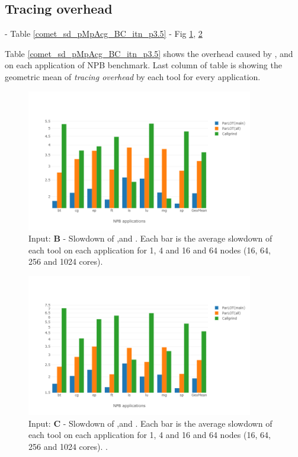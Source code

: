 

\subsection{Tracing overhead}
\label{subsec:lowtoh}
 - Table \ref{comet_sd_pMpAcg_BC_itn_p3.5}
 - Fig \ref{comet_chartAvg_sd_B_p3_5}, \ref{comet_chartAvg_sd_C_p3_5} 
 

   
Table \ref{comet_sd_pMpAcg_BC_itn_p3.5} shows the overhead caused by \parlotm, \parlota and  \callgrind on each application of NPB benchmark.
 Last column of table is showing the geometric mean of \textit{tracing overhead} by each tool for every application. \\
 

\begin{figure}[!t]
\centering
\includegraphics[width=3.9in]{figs.comet.newMed/comet_chartAvg_sd_B_p3_5.png}
\caption{ Input: \textbf{B} - Slowdown of \parlotm ,\parlota and \callgrind. Each bar is the average slowdown of each tool on each application for 1, 4 and 16 and 64 nodes (16, 64, 256 and 1024 cores). 
}
\label{comet_chartAvg_sd_B_p3_5}
\end{figure}


\begin{figure}[!t]
\centering
\includegraphics[width=3.9in]{figs.comet.newMed/comet_chartAvg_sd_C_p3_5.png}
\caption{ Input: \textbf{C} - Slowdown of \parlotm ,\parlota and \callgrind. Each bar is the average slowdown of each tool on each application for 1, 4 and 16 and 64 nodes (16, 64, 256 and 1024 cores). . 
}
\label{comet_chartAvg_sd_C_p3_5}
\end{figure}


